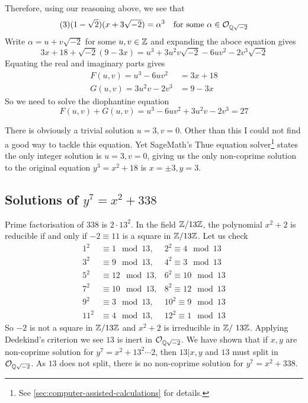 Therefore, using our reasoning above, we see that 
$$
(3)(1-\sqrt{2})(x + 3\sqrt{-2}) =  \alpha^3 \quad \text{for some } \alpha \in \mathcal{O}_{\mathbb{Q}{\sqrt{-2}}}
$$
Write $\alpha = u + v \sqrt{-2}$ for some $u, v \in \mathbb{Z}$ and expanding the aboce equation gives 
$$
3x + 18 + \sqrt{-2} (9 - 3x) = u^3 + 3 u^2 v \sqrt{-2} - 6 uv^2 - 2 v^3 \sqrt{-2}
$$
Equating the real and imaginary parts gives
\begin{align*}
	F(u, v) = u^3 - 6 uv^2 & = 3x + 18\\
	G(u, v) = 3 u^2 v - 2 v^3 & = 9 - 3x
\end{align*}
So we need to solve the diophantine equation 
$$
F(u, v) + G(u, v) = u^3 - 6 uv^2 + 3 u^2 v - 2 v^3 = 27
$$

There is obviously a trivial solution $u=3, v =0$.
Other than this I could not find a good way to tackle this equation.
Yet SageMath's Thue equation solver\footnote{
	See \autoref{sec:computer-assisted-calculations} for details.
} states the only integer solution is $u=3, v=0$, giving us the only non-coprime solution to the original equation $y^3 = x^2 + 18$ is $x = \pm 3, y = 3$.

\subsection{Solutions of \texorpdfstring{$y^7 = x^2 + 338$}{}}
Prime factorisation of $338  $ is $ 2 \cdot 13 ^2 $.
In the field $\mathbb{Z} / 13 \mathbb{Z}$, the polynomial $x^2 + 2$ is reducible if and only if $-2 \equiv 11$ is a square in $\mathbb{Z} / 13 \mathbb{Z}$.
Let us check 
\begin{align*}
	1^2 & \equiv 1 \mod 13,  & 2^2  \equiv 4 \mod 13\\
	3^2 & \equiv 9 \mod 13,  & 4^2  \equiv 3 \mod 13\\
	5^2 & \equiv 12 \mod 13, & 6^2  \equiv 10 \mod 13 \\ 
	7^2 & \equiv 10 \mod 13,& 8^2  \equiv 12 \mod 13\\
	9^2 & \equiv 3 \mod 13, & 10^2  \equiv 9 \mod 13\\ 
	11^2 & \equiv 4 \mod 13,& 12^2  \equiv 1 \mod 13
\end{align*}
So $-2$ is not a square in $\mathbb{Z} / 13 \mathbb{Z}$ and $x^2 +2$ is irreducible in $\mathbb{Z} /\ 13\mathbb{Z}$.
Applying Dedekind's criterion we see $13$ is inert in $\mathcal{O}_{\mathbb{Q}{\sqrt{-2}}}$.
We have shown that if $x, y$ are non-coprime solution for $y^7 = x^2 + 13^2 \cdots 2 $, then $13|x, y$ and $13$ must split in $\mathcal{O}_{\mathbb{Q}{\sqrt{-2}}}$. 
As $13$ does not split, there is no non-coprime solution for $y^7 = x^2 + 338$.

